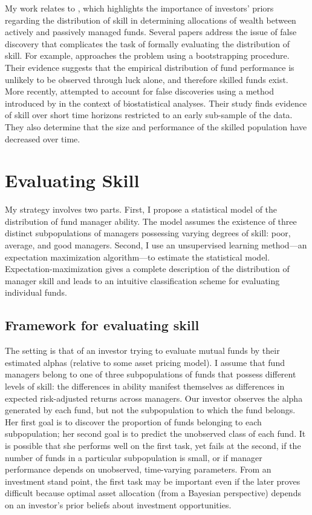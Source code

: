 My work relates to \citet{Baks2001}, which highlights the importance of investors' priors regarding the distribution of skill in determining allocations of wealth between actively and passively managed funds. Several papers address the issue of false discovery that complicates the task of formally evaluating the distribution of skill. For example, \citet{Kosowski2006} approaches the problem using a bootstrapping procedure. Their evidence suggests that the empirical distribution of fund performance is unlikely to be observed through luck alone, and therefore skilled funds exist. More recently, \citet{Barras2010} attempted to account for false discoveries using a method introduced by \citet{Storey2002} in the context of biostatistical analyses. Their study finds evidence of skill over short time horizons restricted to an early sub-sample of the data. They also determine that the size and performance of the skilled population have decreased over time.

\section{Evaluating Skill}
\label{sec:model}

My strategy involves two parts.  First, I propose a statistical model of the distribution of fund manager ability.  The model assumes the existence of three distinct subpopulations of managers possessing varying degrees of skill: poor, average, and good managers.  Second, I use an unsupervised learning method---an expectation maximization algorithm---to estimate the statistical model.  Expectation-maximization gives a complete description of the distribution of manager skill and leads to an intuitive classification scheme for evaluating individual funds.

\subsection{Framework for evaluating skill}
The setting is that of an investor trying to evaluate mutual funds by their estimated alphas (relative to some asset pricing model). I assume that fund managers belong to one of three subpopulations of funds that possess different levels of skill: the differences in ability manifest themselves as differences in expected risk-adjusted returns across managers. Our investor observes the alpha generated by each fund, but not the subpopulation to which the fund belongs. Her first goal is to discover the proportion of funds belonging to each subpopulation; her second goal is to predict the unobserved class of each fund. It is possible that she performs well on the first task, yet fails at the second, if the number of funds in a particular subpopulation is small, or if manager performance depends on unobserved, time-varying parameters. From an investment stand point, the first task may be important even if the later proves difficult because optimal asset allocation (from a Bayesian perspective) depends on an investor's prior beliefs about investment opportunities.

